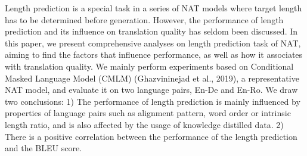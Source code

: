Length prediction is a special task in a series of NAT models where target length has to be determined before generation. However, the performance of length prediction and its influence on translation quality has seldom been discussed. In this paper, we present comprehensive analyses on length prediction task of NAT, aiming to find the factors that influence performance, as well as how it associates with translation quality. We mainly perform experiments based on Conditional Masked Language Model (CMLM) (Ghazvininejad et al., 2019), a representative NAT model, and evaluate it on two language pairs, En-De and En-Ro. We draw two conclusions: 1) The performance of length prediction is mainly influenced by properties of language pairs such as alignment pattern, word order or intrinsic length ratio, and is also affected by the usage of knowledge distilled data. 2) There is a positive correlation between the performance of the length prediction and the BLEU score.
